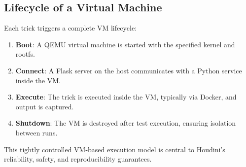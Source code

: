 \documentclass[12pt]{report}
\begin{document}
\begin{doublespace}
\subsection{Lifecycle of a Virtual Machine}

Each trick triggers a complete VM lifecycle:
\begin{enumerate}
\item \textbf{Boot}: A QEMU virtual machine is started with the specified kernel and rootfs.
\item \textbf{Connect}: A Flask server on the host communicates with a Python service inside the VM.
\item \textbf{Execute}: The trick is executed inside the VM, typically via Docker, and output is captured.
\item \textbf{Shutdown}: The VM is destroyed after test execution, ensuring isolation between runs.
\end{enumerate}

This tightly controlled VM-based execution model is central to Houdini's reliability, safety, and reproducibility guarantees.

\end{doublespace} 	\fontsize{12pt}{14pt} \selectfont
\end{document}
